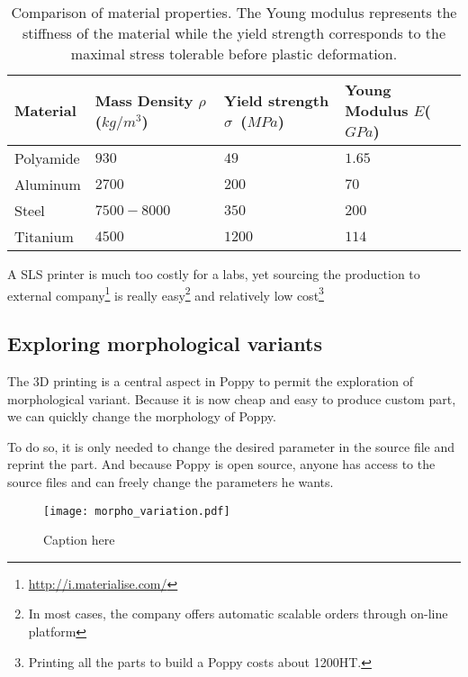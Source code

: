 \begin{table}[h]
    \centering
    \begin{tabularx}{0.8\linewidth }{l X X X}
        Material & Mass Density $\rho$ ($kg/m^3$) &  Yield strength $\sigma$~($MPa$) & Young Modulus $E$($GPa$)\\
        \hline
        Polyamide & $930$ & $49$ & $1.65$\\

        Aluminum & $2700$ & $200$ & $70$\\

        Steel & $7500-8000$ & $350$ & $200$\\

        Titanium & $4500$ & $1200$ & $114$\\

    \end{tabularx}

    \caption{Comparison of material properties.
    The Young modulus represents the stiffness of the material while the yield strength corresponds to the maximal stress tolerable before plastic deformation.}
    \label{tab:materials}
\end{table}

A SLS printer is much too costly for a labs, yet sourcing the production to external company\footnote{\url{http://i.materialise.com/}} is really easy\footnote{In most cases, the company offers automatic scalable orders through on-line platform} and relatively low cost\footnote{Printing all the parts to build a Poppy costs about 1200\texteuro HT.}

\subsection{Exploring morphological variants} %
The 3D printing is a central aspect in Poppy to permit the exploration of morphological variant. Because it is now cheap and easy to produce custom part, we can quickly change the morphology of Poppy.

To do so, it is only needed to change the desired parameter in the source file and reprint the part. And because Poppy is open source, anyone has access to the source files and can freely change the parameters he wants.

\begin{figure}[h]
    \begin{center}
        \texttt{[image: morpho\_variation.pdf]}
    \end{center}
    \caption{Caption here}
    \label{fig:figure1}
\end{figure}


